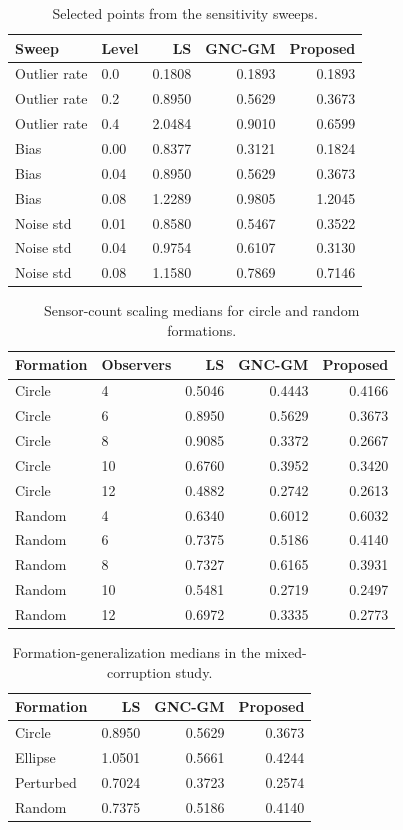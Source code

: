 \begin{table}[H]
\centering
\caption{Selected points from the sensitivity sweeps.}
\label{tab:sensitivityextra}
\small
\begin{tabular}{llrrr}
\toprule
Sweep & Level & LS & GNC-GM & Proposed \\
\midrule
Outlier rate & 0.0 & 0.1808 & 0.1893 & 0.1893 \\
Outlier rate & 0.2 & 0.8950 & 0.5629 & 0.3673 \\
Outlier rate & 0.4 & 2.0484 & 0.9010 & 0.6599 \\
\midrule
Bias & 0.00 & 0.8377 & 0.3121 & 0.1824 \\
Bias & 0.04 & 0.8950 & 0.5629 & 0.3673 \\
Bias & 0.08 & 1.2289 & 0.9805 & 1.2045 \\
\midrule
Noise std & 0.01 & 0.8580 & 0.5467 & 0.3522 \\
Noise std & 0.04 & 0.9754 & 0.6107 & 0.3130 \\
Noise std & 0.08 & 1.1580 & 0.7869 & 0.7146 \\
\bottomrule
\end{tabular}
\end{table}

\begin{table}[H]
\centering
\caption{Sensor-count scaling medians for circle and random formations.}
\label{tab:scalingextra}
\small
\begin{tabular}{llrrr}
\toprule
Formation & Observers & LS & GNC-GM & Proposed \\
\midrule
Circle & 4 & 0.5046 & 0.4443 & 0.4166 \\
Circle & 6 & 0.8950 & 0.5629 & 0.3673 \\
Circle & 8 & 0.9085 & 0.3372 & 0.2667 \\
Circle & 10 & 0.6760 & 0.3952 & 0.3420 \\
Circle & 12 & 0.4882 & 0.2742 & 0.2613 \\
\midrule
Random & 4 & 0.6340 & 0.6012 & 0.6032 \\
Random & 6 & 0.7375 & 0.5186 & 0.4140 \\
Random & 8 & 0.7327 & 0.6165 & 0.3931 \\
Random & 10 & 0.5481 & 0.2719 & 0.2497 \\
Random & 12 & 0.6972 & 0.3335 & 0.2773 \\
\bottomrule
\end{tabular}
\end{table}

\begin{table}[H]
\centering
\caption{Formation-generalization medians in the mixed-corruption study.}
\label{tab:formationextra}
\begin{tabular}{lrrr}
\toprule
Formation & LS & GNC-GM & Proposed \\
\midrule
Circle & 0.8950 & 0.5629 & 0.3673 \\
Ellipse & 1.0501 & 0.5661 & 0.4244 \\
Perturbed & 0.7024 & 0.3723 & 0.2574 \\
Random & 0.7375 & 0.5186 & 0.4140 \\
\bottomrule
\end{tabular}
\end{table}

